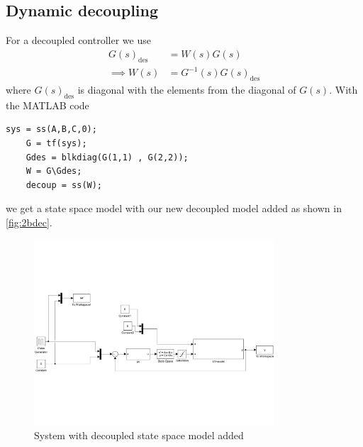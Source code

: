 \documentclass[a4paper]{scrartcl}
\begin{document}
\subsection{Dynamic decoupling}
For a decoupled controller we use
\begin{equation}
	\begin{aligned}
		G(s)_{\text{des}} &= W(s)G(s)\\
		\implies W(s)&= G^{-1}(s)G(s)_{\text{des}}
	\end{aligned}
\end{equation}
where $G(s)_{\text{des}}$ is diagonal with the elements from the diagonal of $G(s)$. With the MATLAB code
\begin{lstlisting}[style = Matlab-editor]
	sys = ss(A,B,C,0);
	G = tf(sys);
	Gdes = blkdiag(G(1,1) , G(2,2));
	W = G\Gdes;
	decoup = ss(W);
\end{lstlisting}
we get a state space model with our new decoupled model added as shown in \autoref{fig:2bdec}.
\begin{figure}[ht!]
	\centering
	\includegraphics[width=0.8\textwidth]{fig/decoupling.pdf}
	\caption{System with decoupled state space model added}
	\label{fig:2bdec}
\end{figure}
\end{document}
